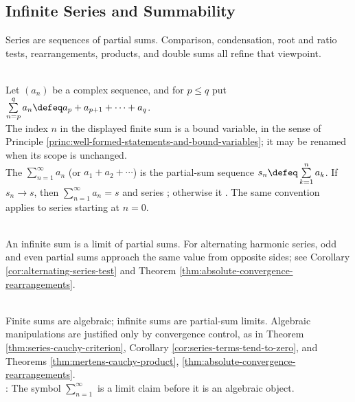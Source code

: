 \subsection{Infinite Series and Summability}

%


Series are sequences of partial sums. Comparison, condensation, root and ratio tests, rearrangements, products, and double sums all refine that viewpoint.

\begin{definition} \label{def:series-core-definitions-source-todo}\label{def:series-and-partial-sums} \\
Let $(a_n)$ be a complex sequence, and for $p\leq q$ put $\sum\limits_{n=p}^{q}a_n\defeq a_p+a_{p+1}+\cdots+a_q$.\\
The index $n$ in the displayed finite sum is a bound variable, in the sense of Principle \ref{princ:well-formed-statements-and-bound-variables}; it may be renamed when its scope is unchanged.\\
The  $\sum_{n=1}^{\infty}a_n$ (or $a_1+a_2+\cdots$) is the partial-sum sequence $s_n\defeq\sum\limits_{k=1}^{n}a_k$. If $s_n\to s$, then $\sum\limits_{n=1}^{\infty}a_n=s$ and series ; otherwise it . The same convention applies to series starting at $n=0$.
\end{definition}


\begin{motivation} \label{mot:partial-sums-remember-order} \\
An infinite sum is a limit of partial sums. For alternating harmonic series, odd and even partial sums approach the same value from opposite sides; see Corollary \ref{cor:alternating-series-test} and Theorem \ref{thm:absolute-convergence-rearrangements}.
\end{motivation}

\begin{perspective} \label{per:formal-series-algebra-needs-convergence} \\
Finite sums are algebraic; infinite sums are partial-sum limits. Algebraic manipulations are justified only by convergence control, as in Theorem \ref{thm:series-cauchy-criterion}, Corollary \ref{cor:series-terms-tend-to-zero}, and Theorems \ref{thm:mertens-cauchy-product}, \ref{thm:absolute-convergence-rearrangements}.\\
: The symbol $\sum_{n=1}^{\infty}$ is a limit claim before it is an algebraic object.
\end{perspective}

